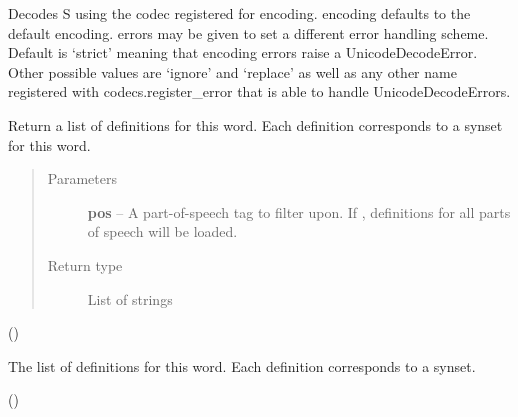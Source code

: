 \documentclass[letterpaper,10pt,english]{sphinxmanual}
\begin{document}
\begin{fulllineitems}
\begin{fulllineitems}
\end{fulllineitems}


\begin{fulllineitems}
\label{api_reference:textblob_de.blob.Word.decode}
Decodes S using the codec registered for encoding. encoding defaults
to the default encoding. errors may be given to set a different error
handling scheme. Default is `strict' meaning that encoding errors raise
a UnicodeDecodeError. Other possible values are `ignore' and `replace'
as well as any other name registered with codecs.register\_error that is
able to handle UnicodeDecodeErrors.

\end{fulllineitems}


\begin{fulllineitems}
\label{api_reference:textblob_de.blob.Word.define}
Return a list of definitions for this word. Each definition
corresponds to a synset for this word.
\begin{quote}\begin{description}
\item[{Parameters}] \leavevmode
\textbf{pos} -- A part-of-speech tag to filter upon. If , definitions
for all parts of speech will be loaded.

\item[{Return type}] \leavevmode
List of strings

\end{description}\end{quote}

()

\end{fulllineitems}


\begin{fulllineitems}
\label{api_reference:textblob_de.blob.Word.definitions}
The list of definitions for this word. Each definition corresponds
to a synset.

()


\end{fulllineitems}
\end{fulllineitems}
\end{document}
